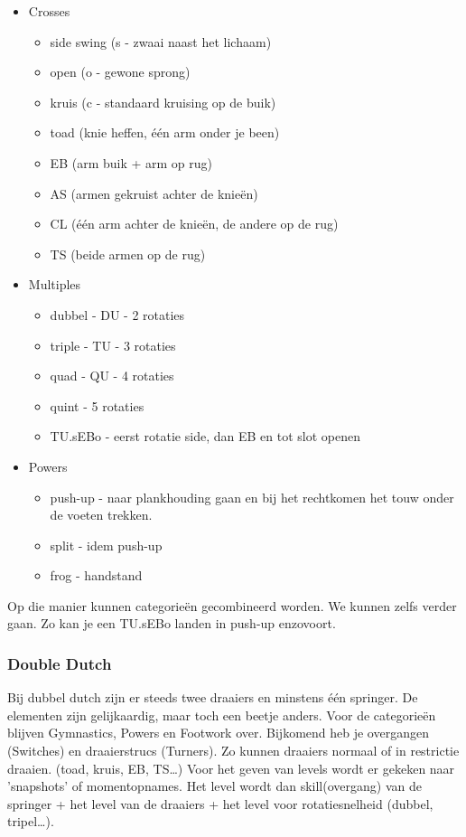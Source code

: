 \begin{itemize}
    \item Crosses
    \begin{itemize}
        \item side swing (s - zwaai naast het lichaam)
        \item open (o - gewone sprong)
        \item kruis (c - standaard kruising op de buik)
        \item toad (knie heffen, één arm onder je been)
        \item EB (arm buik + arm op rug)
        \item AS (armen gekruist achter de knieën)
        \item CL (één arm achter de knieën, de andere op de rug)
        \item TS (beide armen op de rug)
    \end{itemize}
    \item Multiples
    \begin{itemize}
        \item dubbel - DU - 2 rotaties
        \item triple - TU - 3 rotaties
        \item quad - QU - 4 rotaties
        \item quint - 5 rotaties
        \item TU.sEBo - eerst rotatie side, dan EB en tot slot openen
    \end{itemize}
    \item Powers
    \begin{itemize}
        \item push-up - naar plankhouding gaan en bij het rechtkomen het touw onder de voeten trekken.
        \item split - idem push-up
        \item frog - handstand
    \end{itemize}
\end{itemize}

Op die manier kunnen categorieën gecombineerd worden. We kunnen zelfs verder gaan. Zo kan je een TU.sEBo landen in push-up enzovoort.

\subsubsection{Double Dutch}
Bij dubbel dutch zijn er steeds twee draaiers en minstens één springer. De elementen zijn gelijkaardig, maar toch een beetje anders. Voor de categorieën blijven Gymnastics, Powers en Footwork over. Bijkomend heb je overgangen (Switches) en draaierstrucs (Turners). Zo kunnen draaiers normaal of in restrictie draaien. (toad, kruis, EB, TS\dots)
Voor het geven van levels wordt er gekeken naar 'snapshots' of momentopnames. Het level wordt dan skill(overgang) van de springer + het level van de draaiers + het level voor rotatiesnelheid (dubbel, tripel\dots).
    
